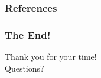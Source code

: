 \documentclass[11pt,aspectratio=169]{beamer}
\begin{document}
    \begin{frame}
        \frametitle{References}
        
        {\footnotesize }
    \end{frame}

    \begin{frame}
        \frametitle{The End!}
        \begin{center}
            \LARGE{Thank you for your time!} \\
            \LARGE{Questions?}
        \end{center}
    \end{frame}
\end{document}

